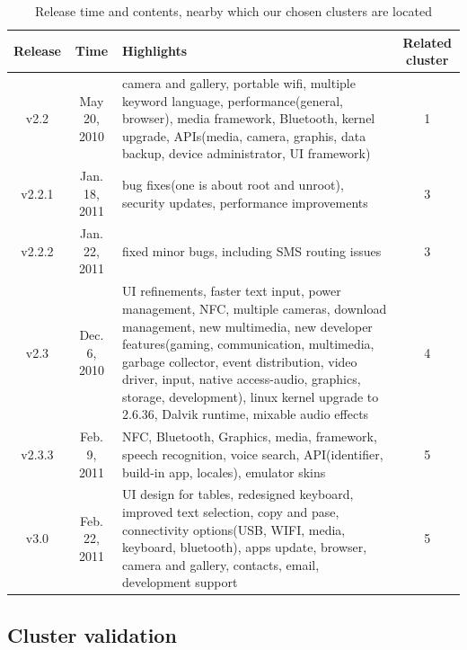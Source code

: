 \documentclass[10pt, conference, compsocconf]{IEEEtran}
\begin{document}
\begin{table}[!t]
\caption{Release time and contents, nearby which our chosen clusters are located}
\label{release}
\centering
\begin{tabular}{|c|c|p{9.5cm}|c|}
\hline
Release & Time & Highlights & Related cluster\\
\hline
v2.2 & May 20, 2010 & camera and gallery, portable wifi, multiple keyword language, performance(general, browser), media framework, Bluetooth, kernel upgrade, APIs(media, camera, graphis, data backup, device administrator, UI framework) & 1 \\
\hline
v2.2.1 & Jan. 18, 2011 & bug fixes(one is about root and unroot), security updates, performance improvements & 3\\
\hline
v2.2.2 & Jan. 22, 2011 & fixed minor bugs, including SMS routing issues & 3\\
\hline
v2.3 & Dec. 6, 2010 & UI refinements, faster text input, power management, NFC, multiple cameras, download management, new multimedia, new developer features(gaming, communication, multimedia, garbage collector, event distribution, video driver, input, native access-audio, graphics, storage, development), linux kernel upgrade to 2.6.36, Dalvik runtime, mixable audio effects & 4\\
\hline
v2.3.3 & Feb. 9, 2011 & NFC, Bluetooth, Graphics, media, framework, speech recognition, voice search, API(identifier, build-in app, locales), emulator skins & 5 \\
\hline
v3.0 & Feb. 22, 2011 & UI design for tables, redesigned keyboard, improved text selection, copy and pase, connectivity options(USB, WIFI, media, keyboard, bluetooth), apps update, browser, camera and gallery, contacts, email, development support & 5 \\
\hline
\end{tabular}
\end{table}




\subsection{Cluster validation}
\end{document}
